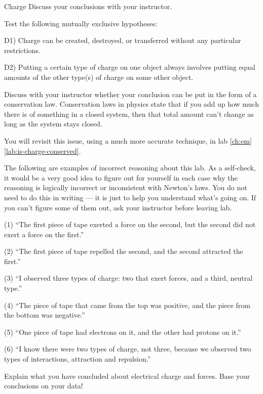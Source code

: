 \begin{lab}{Charge}
Discuss your conclusions with your instructor.


Test the following mutually exclusive hypotheses:

D1) Charge can be created, destroyed, or transferred without
any particular restrictions. 

D2) Putting a certain type of charge on one object always
involves putting equal amounts of the other type(s) of
charge on some other object.

Discuss with your instructor whether your conclusion can be
put in the form of a conservation law. Conservation laws in
physics state that if you add up how much there is of
something in a closed system, then that total amount can't
change as long as the system stays closed.

You will revisit this issue, using a much more accurate
technique, in lab \ref{ch:em}\ref{lab:is-charge-conserved}.

\labselfcheck

The following are examples of incorrect reasoning about this
lab. As a self-check, it would be a very good idea to figure
out for yourself in each case why the reasoning is logically
incorrect or inconsistent with Newton's laws. You do not
need to do this in writing --- it is just to help you
understand what's going on. If you can't figure some of them
out, ask your instructor before leaving lab.

(1) ``The first piece of tape exerted a force on the second,
but the second did not exert a force on the first.''

(2) ``The first piece of tape repelled the second, and the
second attracted the first.''

(3) ``I observed three types of charge: two that exert
forces, and a third, neutral type.''

(4) ``The piece of tape that came from the top was positive,
and the piece from the bottom was negative.''

(5) ``One piece of tape had electrons on it, and the other
had protons on it.''

(6) ``I know there were two types of charge, not three,
because we observed two types of interactions, attraction
and repulsion.''

\labwriteup

Explain what you have concluded about electrical charge and
forces. Base your conclusions on your data!

\end{lab}


